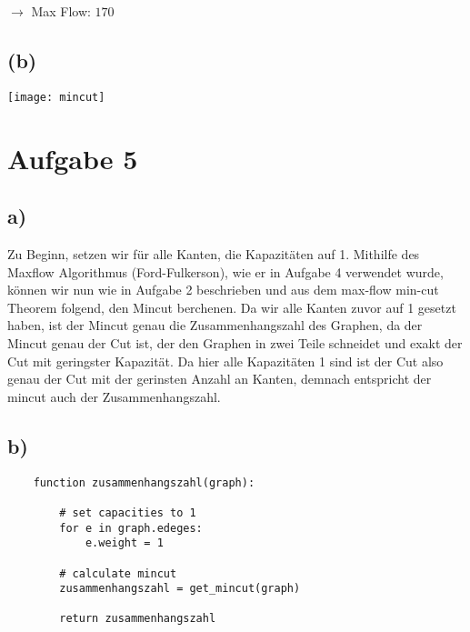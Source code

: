 \documentclass[a4paper]{scrartcl}
\begin{document}
\begin{center}
\end{center}

$\rightarrow$ Max Flow: $170$


\subsection*{(b)}

\texttt{[image: mincut]}


\section*{Aufgabe 5}
\subsection*{a)}
Zu Beginn, setzen wir für alle Kanten, die Kapazitäten auf 1. Mithilfe des Maxflow Algorithmus (Ford-Fulkerson), wie er in Aufgabe 4 verwendet wurde, können wir nun wie in Aufgabe 2 beschrieben und aus dem max-flow min-cut Theorem folgend, den Mincut berchenen. Da wir alle Kanten zuvor auf 1 gesetzt haben, ist der Mincut genau die Zusammenhangszahl des Graphen, da der Mincut genau der Cut ist, der den Graphen in zwei Teile schneidet und exakt der Cut mit geringster Kapazität. Da hier alle Kapazitäten 1 sind ist der Cut also genau der Cut mit der gerinsten Anzahl an Kanten, demnach entspricht der mincut auch der Zusammenhangszahl.



\subsection*{b)}
\begin{lstlisting}
	function zusammenhangszahl(graph):
		
		# set capacities to 1
		for e in graph.edeges:
			e.weight = 1
		
		# calculate mincut
		zusammenhangszahl = get_mincut(graph)
		
		return zusammenhangszahl

\end{lstlisting}
\end{document}
